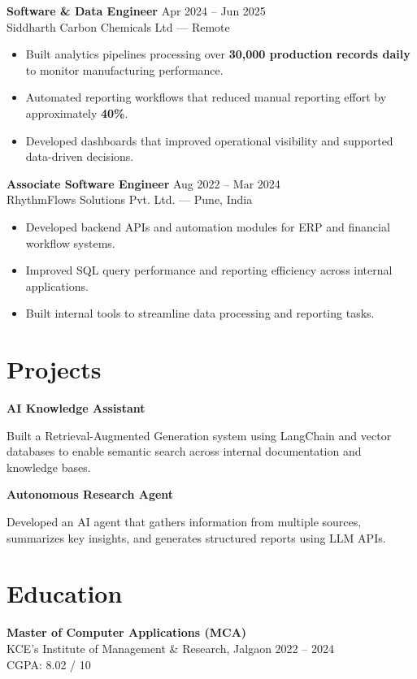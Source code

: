 \documentclass[10pt,a4paper]{article}
\begin{document}
\textbf{Software \& Data Engineer} \hfill Apr 2024 – Jun 2025 \\
Siddharth Carbon Chemicals Ltd — Remote

\begin{itemize}
\item Built analytics pipelines processing over \textbf{30,000 production records daily} to monitor manufacturing performance.
\item Automated reporting workflows that reduced manual reporting effort by approximately \textbf{40\%}.
\item Developed dashboards that improved operational visibility and supported data-driven decisions.
\end{itemize}

\textbf{Associate Software Engineer} \hfill Aug 2022 – Mar 2024 \\
RhythmFlows Solutions Pvt. Ltd. — Pune, India

\begin{itemize}
\item Developed backend APIs and automation modules for ERP and financial workflow systems.
\item Improved SQL query performance and reporting efficiency across internal applications.
\item Built internal tools to streamline data processing and reporting tasks.
\end{itemize}

\section*{Projects}

\textbf{AI Knowledge Assistant}

Built a Retrieval-Augmented Generation system using LangChain and vector databases to enable semantic search across internal documentation and knowledge bases.

\textbf{Autonomous Research Agent}

Developed an AI agent that gathers information from multiple sources, summarizes key insights, and generates structured reports using LLM APIs.

\section*{Education}

\textbf{Master of Computer Applications (MCA)} \\
KCE’s Institute of Management \& Research, Jalgaon \hfill 2022 – 2024 \\
CGPA: 8.02 / 10
\end{document}
